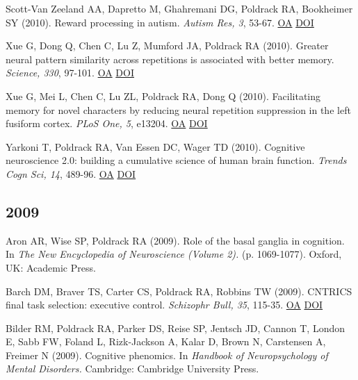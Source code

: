 \documentclass[10pt, letterpaper]{article}
\begin{document}
Scott-Van Zeeland AA, Dapretto M, Ghahremani DG, Poldrack RA, Bookheimer SY (2010). Reward processing in autism. \textit{Autism Res, 3}, 53-67. \href{https://www.ncbi.nlm.nih.gov/pmc/articles/PMC3076289}{OA} \href{http://dx.doi.org/10.1002/aur.122}{DOI} \vspace{2mm}

Xue G, Dong Q, Chen C, Lu Z, Mumford JA, Poldrack RA (2010). Greater neural pattern similarity across repetitions is associated with better memory. \textit{Science, 330}, 97-101. \href{https://www.ncbi.nlm.nih.gov/pmc/articles/PMC2952039}{OA} \href{http://dx.doi.org/10.1126/science.1193125}{DOI} \vspace{2mm}

Xue G, Mei L, Chen C, Lu ZL, Poldrack RA, Dong Q (2010). Facilitating memory for novel characters by reducing neural repetition suppression in the left fusiform cortex. \textit{PLoS One, 5}, e13204. \href{https://www.ncbi.nlm.nih.gov/pmc/articles/PMC2950859}{OA} \href{http://dx.doi.org/10.1371/journal.pone.0013204}{DOI} \vspace{2mm}

Yarkoni T, Poldrack RA, Van Essen DC, Wager TD (2010). Cognitive neuroscience 2.0: building a cumulative science of human brain function. \textit{Trends Cogn Sci, 14}, 489-96. \href{https://www.ncbi.nlm.nih.gov/pmc/articles/PMC2963679}{OA} \href{http://dx.doi.org/10.1016/j.tics.2010.08.004}{DOI} \vspace{2mm}

\subsection*{2009}Aron AR, Wise SP, Poldrack RA (2009). Role of the basal ganglia in cognition. In \textit{The New Encyclopedia of Neuroscience (Volume 2).} (p. 1069-1077). Oxford, UK: Academic Press. \vspace{2mm}

Barch DM, Braver TS, Carter CS, Poldrack RA, Robbins TW (2009). CNTRICS final task selection: executive control. \textit{Schizophr Bull, 35}, 115-35. \href{https://www.ncbi.nlm.nih.gov/pmc/articles/PMC2643948}{OA} \href{http://dx.doi.org/10.1093/schbul/sbn154}{DOI} \vspace{2mm}

Bilder RM, Poldrack RA, Parker DS, Reise SP, Jentsch JD, Cannon T, London E, Sabb FW, Foland L, Rizk-Jackson A, Kalar D, Brown N, Carstensen A, Freimer N (2009). Cognitive phenomics. In \textit{Handbook of Neuropsychology of Mental Disorders.} Cambridge: Cambridge University Press. \vspace{2mm}
\end{document}
